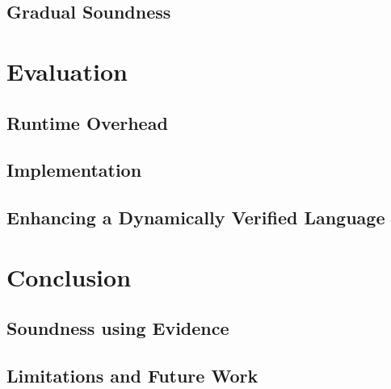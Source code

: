 \section{Gradual Soundness}
\label{sec:gradual-soundness}



\chapter{Evaluation}
\label{ch:evaluation-analysis}


\section{Runtime Overhead}
\label{sec:runtime-overhead}


\section{Implementation}
\label{sec:implementation}


\section{Enhancing a Dynamically Verified Language}
\label{sec:enhancing-an-unverified}



\chapter{Conclusion}
\label{ch:conclusion}


\section{Soundness using Evidence}
\label{sec:soundness-using-evidence}


\section{Limitations and Future Work}
\label{sec:future-work}


